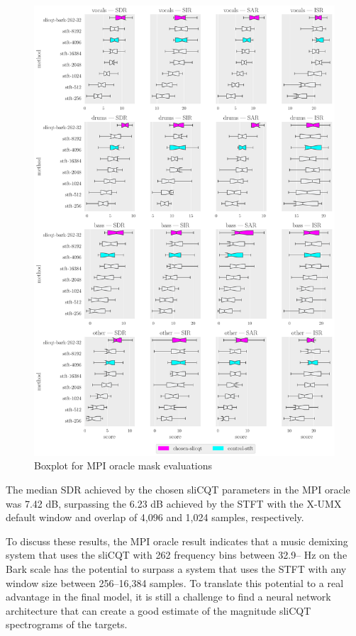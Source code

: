 \documentclass[report.tex]{subfiles}
\begin{document}
\begin{figure}[ht]
	\centering
	\includegraphics[width=\textwidth]{./images-bss/oracle_boxplot.pdf}
	\caption{Boxplot for MPI oracle mask evaluations}
	\label{fig:oraclebssboxplot}
\end{figure}

The median SDR achieved by the chosen sliCQT parameters in the MPI oracle was 7.42 dB, surpassing the 6.23 dB achieved by the STFT with the X-UMX default window and overlap of 4,096 and 1,024 samples, respectively.

To discuss these results, the MPI oracle result indicates that a music demixing system that uses the sliCQT with 262 frequency bins between 32.9-- Hz on the Bark scale has the potential to surpass a system that uses the STFT with any window size between 256--16,384 samples. To translate this potential to a real advantage in the final model, it is still a challenge to find a neural network architecture that can create a good estimate of the magnitude sliCQT spectrograms of the targets.
\end{document}
